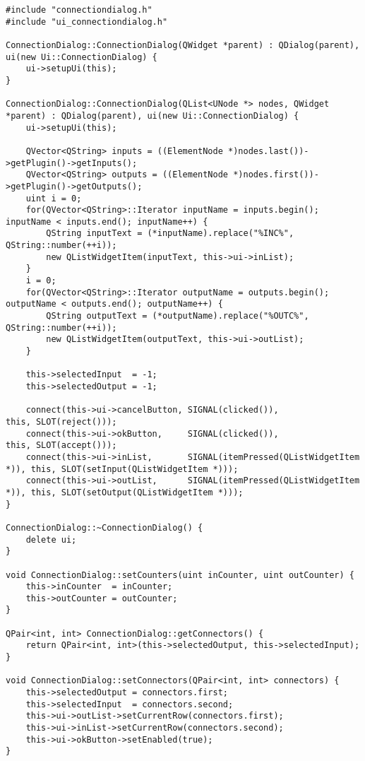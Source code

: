 \begin{lstlisting}
#include "connectiondialog.h"
#include "ui_connectiondialog.h"

ConnectionDialog::ConnectionDialog(QWidget *parent) : QDialog(parent), ui(new Ui::ConnectionDialog) {
    ui->setupUi(this);
}

ConnectionDialog::ConnectionDialog(QList<UNode *> nodes, QWidget *parent) : QDialog(parent), ui(new Ui::ConnectionDialog) {
    ui->setupUi(this);

    QVector<QString> inputs = ((ElementNode *)nodes.last())->getPlugin()->getInputs();
    QVector<QString> outputs = ((ElementNode *)nodes.first())->getPlugin()->getOutputs();
    uint i = 0;
    for(QVector<QString>::Iterator inputName = inputs.begin(); inputName < inputs.end(); inputName++) {
        QString inputText = (*inputName).replace("%INC%", QString::number(++i));
        new QListWidgetItem(inputText, this->ui->inList);
    }
    i = 0;
    for(QVector<QString>::Iterator outputName = outputs.begin(); outputName < outputs.end(); outputName++) {
        QString outputText = (*outputName).replace("%OUTC%", QString::number(++i));
        new QListWidgetItem(outputText, this->ui->outList);
    }

    this->selectedInput  = -1;
    this->selectedOutput = -1;

    connect(this->ui->cancelButton, SIGNAL(clicked()),              this, SLOT(reject()));
    connect(this->ui->okButton,     SIGNAL(clicked()),              this, SLOT(accept()));
    connect(this->ui->inList,       SIGNAL(itemPressed(QListWidgetItem *)), this, SLOT(setInput(QListWidgetItem *)));
    connect(this->ui->outList,      SIGNAL(itemPressed(QListWidgetItem *)), this, SLOT(setOutput(QListWidgetItem *)));
}

ConnectionDialog::~ConnectionDialog() {
    delete ui;
}

void ConnectionDialog::setCounters(uint inCounter, uint outCounter) {
    this->inCounter  = inCounter;
    this->outCounter = outCounter;
}

QPair<int, int> ConnectionDialog::getConnectors() {
    return QPair<int, int>(this->selectedOutput, this->selectedInput);
}

void ConnectionDialog::setConnectors(QPair<int, int> connectors) {
    this->selectedOutput = connectors.first;
    this->selectedInput  = connectors.second;
    this->ui->outList->setCurrentRow(connectors.first);
    this->ui->inList->setCurrentRow(connectors.second);
    this->ui->okButton->setEnabled(true);
}


\end{lstlisting}
